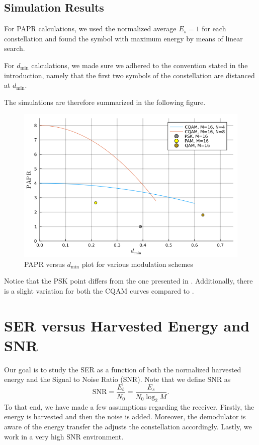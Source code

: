 \documentclass[11pt,a4paper,onecolumn,final]{article}
\newcommand{\dmin}{d_\text{min}}
\begin{document}
\subsection{Simulation Results}
For PAPR calculations, we used the normalized average \(E_s = 1\) for each constellation and found the symbol with maximum energy by means of linear search. 

For \(\dmin \) calculations, we made sure we adhered to the convention stated in the introduction, namely that the first two symbols of the constellation are distanced at \(\dmin\). 

The simulations are therefore summarized in the following figure. 

\newpage
\begin{figure}[h]
    \centering
    \includegraphics[scale=0.7]{ex1_sim.png}
    \caption{PAPR versus \(\dmin \) plot for various modulation schemes}
\end{figure}

Notice that the PSK point differs from the one presented in \cite{cqam}. Additionally, there is a slight variation for both the CQAM curves compared to \cite{cqam}. 

\section{SER versus Harvested Energy and SNR}
Our goal is to study the SER as a function of both the normalized harvested energy and the Signal to Noise Ratio (SNR). Note that we define SNR as 
\begin{equation}
    \text{SNR} = \frac{E_b}{N_0} = \frac{E_s }{N_0 \log_2 M}. 
\end{equation}
To that end, we have made a few assumptions regarding the receiver. Firstly, the energy is harvested and then the noise is added. Moreover, the demodulator is aware of the energy transfer the adjusts the constellation accordingly. Lastly, we work in a very high SNR environment.
\end{document}
